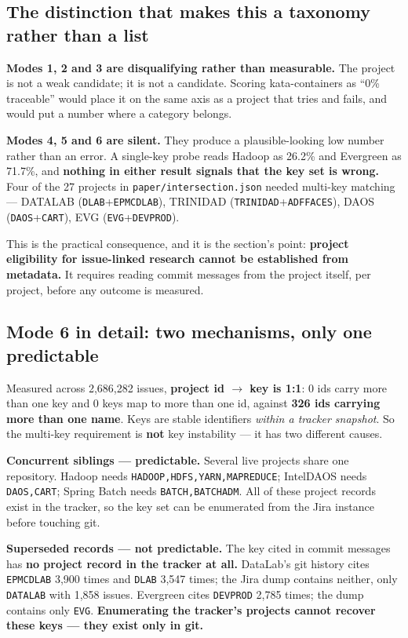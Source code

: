 \documentclass[11pt,a4paper]{article}
\begin{document}
\subsection{The distinction that makes this a taxonomy rather than a list}
\label{sec:5.1}

\textbf{Modes 1, 2 and 3 are disqualifying rather than measurable.} The project is not a weak candidate; it is not a candidate. Scoring kata-containers as ``0\% traceable'' would place it on the same axis as a project that tries and fails, and would put a number where a category belongs.

\textbf{Modes 4, 5 and 6 are silent.} They produce a plausible-looking low number rather than an error. A single-key probe reads Hadoop as 26.2\% and Evergreen as 71.7\%, and \textbf{nothing in either result signals that the key set is wrong.} Four of the 27 projects in \texttt{paper/\allowbreak{}intersection.\allowbreak{}json} needed multi-key matching --- DATALAB (\texttt{DLAB}+\texttt{EPMCDLAB}), TRINIDAD (\texttt{TRINIDAD}+\texttt{ADFFACES}), DAOS (\texttt{DAOS}+\texttt{CART}), EVG (\texttt{EVG}+\texttt{DEVPROD}).

This is the practical consequence, and it is the section's point: \textbf{project eligibility for issue-linked research cannot be established from metadata.} It requires reading commit messages from the project itself, per project, before any outcome is measured.

\subsection{Mode 6 in detail: two mechanisms, only one predictable}
\label{sec:5.2}

Measured across 2,686,282 issues, \textbf{project id $\rightarrow$ key is 1:1}: 0 ids carry more than one key and 0 keys map to more than one id, against \textbf{326 ids carrying more than one name}. Keys are stable identifiers \emph{within a tracker snapshot}. So the multi-key requirement is \textbf{not} key instability --- it has two different causes.

\textbf{Concurrent siblings --- predictable.} Several live projects share one repository. Hadoop needs \texttt{HADOOP,HDFS,YARN,MAPREDUCE}; IntelDAOS needs \texttt{DAOS,CART}; Spring Batch needs \texttt{BATCH,BATCHADM}. All of these project records exist in the tracker, so the key set can be enumerated from the Jira instance before touching git.

\textbf{Superseded records --- not predictable.} The key cited in commit messages has \textbf{no project record in the tracker at all.} DataLab's git history cites \texttt{EPMCDLAB} 3,900 times and \texttt{DLAB} 3,547 times; the Jira dump contains neither, only \texttt{DATALAB} with 1,858 issues. Evergreen cites \texttt{DEVPROD} 2,785 times; the dump contains only \texttt{EVG}. \textbf{Enumerating the tracker's projects cannot recover these keys --- they exist only in git.}
\end{document}
